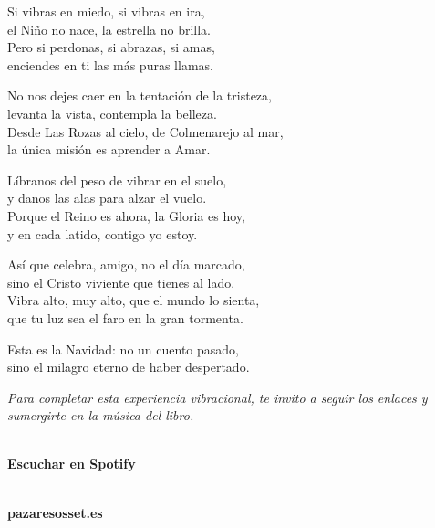 {\vspace{0.4cm}

Si vibras en miedo, si vibras en ira, \\
el Niño no nace, la estrella no brilla. \\
Pero si perdonas, si abrazas, si amas, \\
enciendes en ti las más puras llamas.

\vspace{0.4cm}

No nos dejes caer en la tentación de la tristeza, \\
levanta la vista, contempla la belleza. \\
Desde Las Rozas al cielo, de Colmenarejo al mar, \\
la única misión es aprender a Amar.

\vspace{0.4cm}

Líbranos del peso de vibrar en el suelo, \\
y danos las alas para alzar el vuelo. \\
Porque el Reino es ahora, la Gloria es hoy, \\
y en cada latido, contigo yo estoy.

\vspace{0.4cm}

Así que celebra, amigo, no el día marcado, \\
sino el Cristo viviente que tienes al lado. \\
Vibra alto, muy alto, que el mundo lo sienta, \\
que tu luz sea el faro en la gran tormenta.

\vspace{0.4cm}

Esta es la Navidad: no un cuento pasado, \\
sino el milagro eterno de haber despertado.
\par}


\vspace{1.5cm}
\begin{center}
\textit{Para completar esta experiencia vibracional, te invito a seguir los enlaces y sumergirte en la música del libro.}\\
\vspace{1cm}
\begin{minipage}{0.45\textwidth}
\centering
{}\\
\vspace{0.4cm}\textbf{Escuchar en Spotify}
\end{minipage}\hfill
\begin{minipage}{0.45\textwidth}
\centering
{}\\
\vspace{0.4cm}\textbf{pazaresosset.es}
\end{minipage}
\end{center}